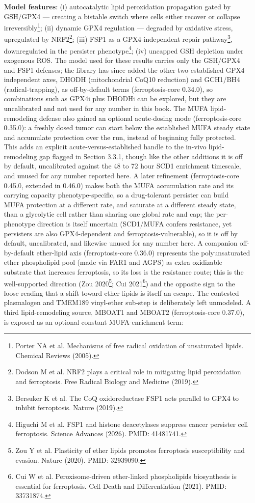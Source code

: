 \documentclass[11pt,twoside,openright]{report}
\begin{document}
\textbf{Model features}: (i) autocatalytic lipid peroxidation propagation gated by GSH/GPX4 --- creating a bistable switch where cells either recover or collapse irreversibly\footnote{Porter NA et al. Mechanisms of free radical oxidation of unsaturated lipids. Chemical Reviews (2005).}; (ii) dynamic GPX4 regulation --- degraded by oxidative stress, upregulated by NRF2\footnote{Dodson M et al. NRF2 plays a critical role in mitigating lipid peroxidation and ferroptosis. Free Radical Biology and Medicine (2019).}; (iii) FSP1 as a GPX4-independent repair pathway\footnote{Bersuker K et al. The CoQ oxidoreductase FSP1 acts parallel to GPX4 to inhibit ferroptosis. Nature (2019).}, downregulated in the persister phenotype\footnote{Higuchi M et al. FSP1 and histone deacetylases suppress cancer persister cell ferroptosis. Science Advances (2026). PMID: 41481741.}; (iv) uncapped GSH depletion under exogenous ROS. The model used for these results carries only the GSH/GPX4 and FSP1 defenses; the library has since added the other two established GPX4-independent axes, DHODH (mitochondrial CoQ10 reduction) and GCH1/BH4 (radical-trapping), as off-by-default terms (ferroptosis-core 0.34.0), so combinations such as GPX4i plus DHODHi can be explored, but they are uncalibrated and not used for any number in this book. The MUFA lipid-remodeling defense also gained an optional acute-dosing mode (ferroptosis-core 0.35.0): a freshly dosed tumor can start below the established MUFA steady state and accumulate protection over the run, instead of beginning fully protected. This adds an explicit acute-versus-established handle to the in-vivo lipid-remodeling gap flagged in Section 3.3.1, though like the other additions it is off by default, uncalibrated against the 48 to 72 hour SCD1 enrichment timescale, and unused for any number reported here. A later refinement (ferroptosis-core 0.45.0, extended in 0.46.0) makes both the MUFA accumulation rate and its carrying capacity phenotype-specific, so a drug-tolerant persister can build MUFA protection at a different rate, and saturate at a different steady state, than a glycolytic cell rather than sharing one global rate and cap; the per-phenotype direction is itself uncertain (SCD1/MUFA confers resistance, yet persisters are also GPX4-dependent and ferroptosis-vulnerable), so it is off by default, uncalibrated, and likewise unused for any number here. A companion off-by-default ether-lipid axis (ferroptosis-core 0.36.0) represents the polyunsaturated ether phospholipid pool (made via FAR1 and AGPS) as extra oxidizable substrate that increases ferroptosis, so its loss is the resistance route; this is the well-supported direction (Zou 2020\footnote{Zou Y et al. Plasticity of ether lipids promotes ferroptosis susceptibility and evasion. Nature (2020). PMID: 32939090.}; Cui 2021\footnote{Cui W et al. Peroxisome-driven ether-linked phospholipids biosynthesis is essential for ferroptosis. Cell Death and Differentiation (2021). PMID: 33731874.}) and the opposite sign to the loose reading that a shift toward ether lipids is itself an escape. The contested plasmalogen and TMEM189 vinyl-ether sub-step is deliberately left unmodeled. A third lipid-remodeling source, MBOAT1 and MBOAT2 (ferroptosis-core 0.37.0), is exposed as an optional constant MUFA-enrichment term: 
\end{document}
